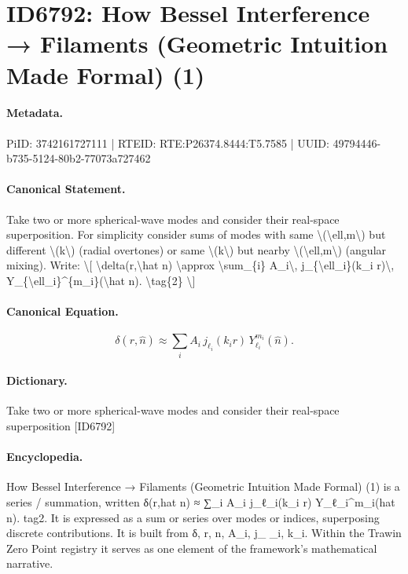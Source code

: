 \section*{ID6792: How Bessel Interference → Filaments (Geometric Intuition Made Formal) (1)}
\paragraph{Metadata.}
PiID: 3742161727111 | RTEID: RTE:P26374.8444:T5.7585 | UUID: 49794446-b735-5124-80b2-77073a727462

\paragraph{Canonical Statement.}
Take two or more spherical-wave modes and consider their real-space superposition. For simplicity consider sums of modes with same \textbackslash{}(\textbackslash{}ell,m\textbackslash{}) but different \textbackslash{}(k\textbackslash{}) (radial overtones) or same \textbackslash{}(k\textbackslash{}) but nearby \textbackslash{}(\textbackslash{}ell,m\textbackslash{}) (angular mixing). Write: \textbackslash{}[ \textbackslash{}delta(r,\textbackslash{}hat n) \textbackslash{}approx \textbackslash{}sum\_\{i\} A\_i\textbackslash{}, j\_\{\textbackslash{}ell\_i\}(k\_i r)\textbackslash{}, Y\_\{\textbackslash{}ell\_i\}\textasciicircum{}\{m\_i\}(\textbackslash{}hat n). \textbackslash{}tag\{2\} \textbackslash{}]

\paragraph{Canonical Equation.}
\[
\delta(r,\hat n) \approx \sum_{i} A_i\, j_{\ell_i}(k_i r)\, Y_{\ell_i}^{m_i}(\hat n). \tag{2}
\]

\paragraph{Dictionary.}
Take two or more spherical-wave modes and consider their real-space superposition [ID6792]

\paragraph{Encyclopedia.}
How Bessel Interference → Filaments (Geometric Intuition Made Formal) (1) is a series / summation, written δ(r,hat n) ≈ ∑\_i A\_i j\_ℓ\_i(k\_i r) Y\_ℓ\_i\textasciicircum{}m\_i(hat n). tag2. It is expressed as a sum or series over modes or indices, superposing discrete contributions. It is built from δ, r, n, A\_i, j\_ \_i, k\_i. Within the Trawin Zero Point registry it serves as one element of the framework's mathematical narrative.

